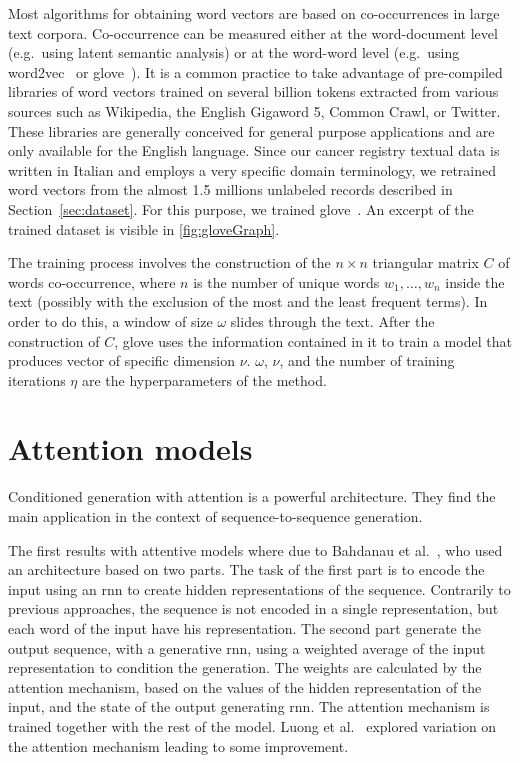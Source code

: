 Most algorithms for obtaining word vectors are based on co-occurrences
in large text corpora. Co-occurrence can be measured either at the
word-document level (e.g.\ using latent semantic analysis) or at the
word-word level (e.g.\ using word2vec~\cite{mikolov_linguistic_2013}
or \ac{glove}~\cite{pennington_glove:_2014}). It is a common practice to
take advantage of pre-compiled libraries of word vectors trained on
several billion tokens extracted from various sources such as
Wikipedia, the English Gigaword 5, Common Crawl, or Twitter. These
libraries are generally conceived for general purpose applications and
are only available for the English language. Since our cancer registry
textual data is written in Italian and employs a very specific domain
terminology, we retrained word vectors from the almost 1.5 millions
unlabeled records described in Section~\ref{sec:dataset}. For this
purpose, we trained \ac{glove}~\cite{pennington_glove:_2014}. An
excerpt of the trained dataset is visible in \cref{fig:gloveGraph}.

The training process involves the construction of the
$n\times n$ triangular matrix $C$ of words co-occurrence, where $n$ is
the number of unique words $w_1,\dots,w_n$ inside the text (possibly
with the exclusion of the
  most and the least frequent terms). In order to do this, a window of
size $\omega$ slides
through the text. After the construction of $C$, \ac{glove} uses the
information contained in it to train a model that produces vector of
specific dimension $\nu$. $\omega$, $\nu$, and the number of
training iterations $\eta$ are the hyperparameters of the method. 

\section{Attention models}
Conditioned generation with attention is a powerful architecture. They
find the main application in the context of sequence-to-sequence
generation.

The first results with attentive models where due to Bahdanau et al.\
\cite{bahdanau_neural_2014}, who used an architecture based on two
parts. The task of the first part is to encode the input using an
\ac{rnn} to create hidden representations of the sequence. Contrarily
to previous approaches, the sequence is not encoded in a single
representation, but each word of the input have his
representation. The second part generate the output
sequence, with a generative \ac{rnn}, using a weighted average of the
input representation to condition the generation. The weights are
calculated by the attention mechanism, based on the values of the
hidden representation of the input, and the state of the output
generating \ac{rnn}. The attention mechanism is trained together with
the rest of the model. Luong et al.\ \cite{luong2015effective}
explored variation on the attention mechanism leading to some
improvement.

